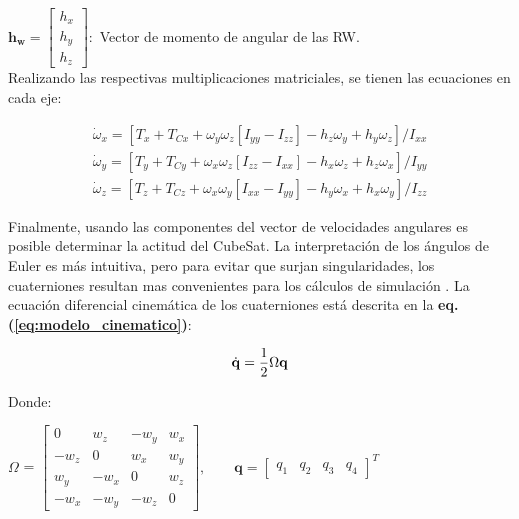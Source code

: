 $\mathbf{h_w}=\left[\begin{array}{l}h_x \\ h_y \\ h_z\end{array}\right]:$ Vector de momento de angular de las RW.\\[10pt]	

\noindent Realizando las respectivas multiplicaciones matriciales, se tienen las ecuaciones en cada eje:

\begin{gather}	
	\dot{\omega}_x=\left[T_x+T_{C x}+\omega_y \omega_z\left[I_{y y}-I_{z z}\right]-h_z \omega_y+h_y \omega_z\right] / I_{x x}\label{eq:modelo_dinamico_x}\\
	\dot{\omega}_y=\left[T_y+T_{C y}+\omega_x \omega_z\left[I_{z z}-I_{x x}\right]-h_x \omega_z+h_z \omega_x\right] / I_{y y}\label{eq:modelo_dinamico_y}\\
	\dot{\omega}_z=\left[T_z+T_{C z}+\omega_x \omega_y\left[I_{x x}-I_{y y}\right]-h_y \omega_x+h_x \omega_y\right] / I_{z z}
\end{gather}


Finalmente, usando las componentes del vector de velocidades angulares es posible determinar la actitud del CubeSat. La interpretación de los ángulos de Euler es más intuitiva, pero para evitar que surjan singularidades, los cuaterniones resultan mas convenientes para los cálculos de simulación \cite{Steyn2011}. La ecuación diferencial cinemática de los cuaterniones está descrita en la  \textbf{eq.(\ref{eq:modelo_cinematico})}: 

\begin{equation}\label{eq:modelo_cinematico}
	\dot{\mathbf{q}}=\frac{1}{2} \Omega \mathbf{q} \\
\end{equation}

Donde:
 

\begin{center}
	$\Omega$ = $\left[\begin{array}{cccc}
		0 & w_z & -w_y & w_x \\
		-w_z & 0 & w_x & w_y \\
		w_y & -w_x & 0 & w_z \\
		-w_x & -w_y & -w_z & 0
	\end{array}\right],
	\qquad
	\mathbf{q}=\left[\begin{array}{llll}
		q_1 & q_2 & q_3 & q_4
	\end{array}\right]^T
	$
\end{center}

